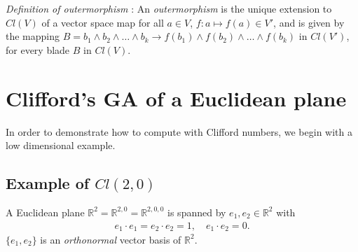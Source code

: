 \documentclass[cameraready]{jcmsi}%
\newcommand{\R}{\mathbb{R}}
\begin{document}
\textit{Definition of outermorphism} \cite{AM:LinGA,HS:CAtoGC}: 
An \textit{outermorphism} is the unique extension to $Cl(V)$ of a vector space map for all $a\in V$, $f: a\mapsto f(a) \in V'$, and is given by the mapping $B = b_1 \wedge b_2 \wedge \ldots \wedge b_k \rightarrow f(b_1) \wedge f(b_2) \wedge \ldots \wedge f(b_k)$ in $Cl(V')$, for every blade $B$ in $Cl(V)$.



\section{Clifford's GA of a Euclidean plane}

In order to demonstrate how to compute with Clifford numbers, we begin with a low dimensional example. 

\subsection{Example of $Cl(2,0)$}
A Euclidean plane $\R^2=\R^{2,0}=\R^{2,0,0}$ is spanned by $e_1, e_2 \in \R^2$ with 
\begin{gather}
  e_1\cdot e_1 = e_2\cdot e_2 = 1, \quad e_1\cdot e_2 = 0.
\end{gather}
$\{e_1, e_2\}$ is an \textit{orthonormal} vector basis of $\R^2$. 
\end{document}
